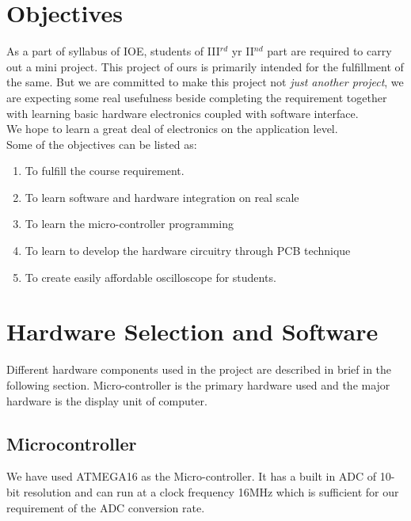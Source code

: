 \documentclass[12pt,a4paper]{article}
\begin{document}
\section{Objectives}
	As a part of syllabus of IOE, students of III${}^{rd}$ yr II${}^{nd}$ part are required to carry out a mini project. This project of ours is primarily intended for the fulfillment of the same. But we are committed to make this project not \emph{just another project}, we are expecting some real usefulness beside completing the requirement together with learning basic hardware electronics coupled with software interface.\\

	We hope to learn a great deal of electronics on the application level.\\

	Some of the objectives can be listed as:\\
	
	\begin{enumerate}
		\item To fulfill the course requirement.
		\item To learn software and hardware integration on real scale
		\item To learn the micro-controller programming
		\item To learn to develop the hardware circuitry through PCB technique
		\item To create easily affordable oscilloscope for students.
	\end{enumerate}

	\section{Hardware Selection and Software}
		Different hardware components used in the project are described in brief in the following section. Micro-controller is the primary hardware used and the major hardware is the display unit of computer.
	\subsection{Microcontroller}
		We have used ATMEGA16 as the Micro-controller. It has a built in ADC of 10-bit resolution and can run at a clock frequency 16MHz which is sufficient for our requirement of the ADC conversion rate.
\end{document}
